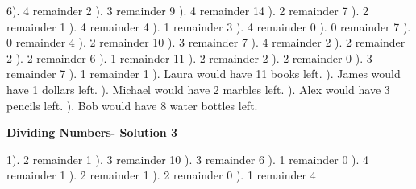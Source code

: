 \documentclass{article}%
\begin{document}
6). 4 remainder 2%
). 3 remainder 9%
). 4 remainder 14%
). 2 remainder 7%
). 2 remainder 1%
). 4 remainder 4%
). 1 remainder 3%
). 4 remainder 0%
). 0 remainder 7%
). 0 remainder 4%
). 2 remainder 10%
). 3 remainder 7%
). 4 remainder 2%
). 2 remainder 2%
). 2 remainder 6%
). 1 remainder 11%
). 2 remainder 2%
). 2 remainder 0%
). 3 remainder 7%
). 1 remainder 1%
). Laura would have 11 books left.%
). James would have 1 dollars left.%
). Michael would have 2 marbles left.%
). Alex would have 3 pencils left.%
). Bob would have 8 water bottles left.%
\newline%
\newpage%
\large%
\begin{center}%
\textbf{Dividing Numbers- Solution 3}%
\newline%
\end{center} \normalsize%
1). 2 remainder 1%
). 3 remainder 10%
). 3 remainder 6%
). 1 remainder 0%
). 4 remainder 1%
). 2 remainder 1%
). 2 remainder 0%
). 1 remainder 4%
\newline%
\end{document}
